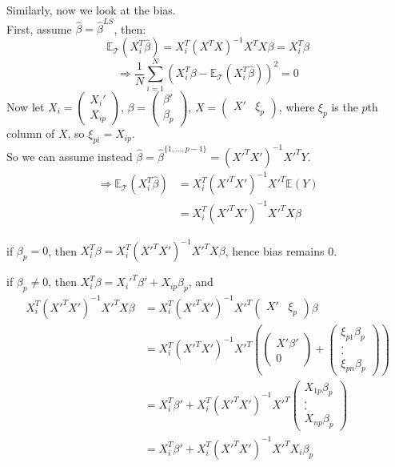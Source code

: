 \documentclass{article}
\newcommand{\hb}{\hat{\beta}}
\begin{document}
	Similarly, now we look at the bias.\\
	First, assume $ \hb = \hb^{LS} $, then:
	\[\mathbb{E}_{\mathcal{T}}(X_i^T \hb ) = X_i^T (X^TX)^{-1}X^T X \beta = X_i^T \beta\]
	\[\Rightarrow \frac{1}{N} \sum_{i = 1}^{N} (X_i^T \beta - \mathbb{E}_{\mathcal{T}}(X_i^T \hb ))^2 = 0\]
	Now let $ X_i = \begin{pmatrix} X_i' \\ X_{ip} \end{pmatrix} $, $ \beta = \begin{pmatrix} \beta' \\ \beta_p \end{pmatrix} $, $ X = \begin{pmatrix} X' & \xi_p \end{pmatrix} $, where $ \xi_p $ is the $ p $th column of $ X $, so $ \xi_{pi} = X_{ip} $.\\
	So we can assume instead $ \hb = \hb^{\{1, ..., p-1\}} = (X'^T X')^{-1} X'^T Y $.
	\begin{align*}
		\Rightarrow \mathbb{E}_{\mathcal{T}}(X_i^T \hb) &= X_i^T (X'^TX')^{-1}X'^T \mathbb{E}(Y)\\
		&= X_i^T(X'^TX')^{-1} X'^T X \beta
	\end{align*}

	if $ \beta_p = 0 $, then $ X_i^T \beta = X_i^T (X'^TX')^{-1} X'^TX \beta $, hence bias remains 0.
	
	if $ \beta_p \neq 0 $, then $ X_i^T \beta = X_i'^T \beta' + X_{ip}\beta_p $, and
	\begin{align*}
		X_i^T(X'^TX')^{-1} X'^T X \beta & = X_i^T(X'^TX')^{-1} X'^T\begin{pmatrix}X' & \xi_p \end{pmatrix}\beta \\
		&= X_i^T(X'^TX')^{-1} X'^T (\begin{pmatrix} X' \beta' \\ 0 \end{pmatrix} + \begin{pmatrix} \xi_{p1} \beta_p \\. \\ . \\ \xi_{pn} \beta_p \end{pmatrix}) \\
		&= X_i^T \beta' + X_i^T(X'^TX')^{-1} X'^T\begin{pmatrix} X_{1p} \beta_p \\. \\ . \\ X_{np} \beta_p \end{pmatrix}\\
		&= X_i^T \beta' + X_i^T(X'^TX')^{-1} X'^TX_i \beta_p\\
	\end{align*}
\end{document}
